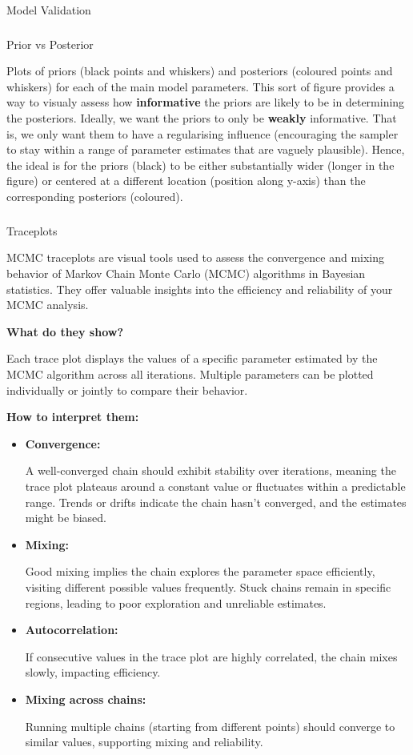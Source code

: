 \documentclass[
  8pt,
  a4paper]{article}
\makeatletter
\let\oldparagraph\paragraph
\renewcommand{\paragraph}{
    \@ifstar
      \xxxParagraphStar
      \xxxParagraphNoStar
  }
\newcommand{\xxxParagraphStar}[1]{\oldparagraph*{#1}\mbox{}}
\newcommand{\xxxParagraphNoStar}[1]{\oldparagraph{#1}\mbox{}}
\let\oldsubparagraph\subparagraph
\renewcommand{\subparagraph}{
    \@ifstar
      \xxxSubParagraphStar
      \xxxSubParagraphNoStar
  }
\newcommand{\xxxSubParagraphStar}[1]{\oldsubparagraph*{#1}\mbox{}}
\newcommand{\xxxSubParagraphNoStar}[1]{\oldsubparagraph{#1}\mbox{}}
\makeatother
\begin{document}
\paragraph{Model Validation}\label{sec-validation}

\subparagraph{Prior vs Posterior}\label{prior-vs-posterior}

Plots of priors (black points and whiskers) and posteriors (coloured
points and whiskers) for each of the main model parameters. This sort of
figure provides a way to visualy assess how \textbf{informative} the
priors are likely to be in determining the posteriors. Ideally, we want
the priors to only be \textbf{weakly} informative. That is, we only want
them to have a regularising influence (encouraging the sampler to stay
within a range of parameter estimates that are vaguely plausible).
Hence, the ideal is for the priors (black) to be either substantially
wider (longer in the figure) or centered at a different location
(position along y-axis) than the corresponding posteriors (coloured).

\subparagraph{Traceplots}\label{traceplots}

MCMC traceplots are visual tools used to assess the convergence and
mixing behavior of Markov Chain Monte Carlo (MCMC) algorithms in
Bayesian statistics. They offer valuable insights into the efficiency
and reliability of your MCMC analysis.

\textbf{What do they show?}

Each trace plot displays the values of a specific parameter estimated by
the MCMC algorithm across all iterations. Multiple parameters can be
plotted individually or jointly to compare their behavior.

\textbf{How to interpret them:}

\begin{itemize}
\item
  \textbf{Convergence:}

  A well-converged chain should exhibit stability over iterations,
  meaning the trace plot plateaus around a constant value or fluctuates
  within a predictable range. Trends or drifts indicate the chain hasn't
  converged, and the estimates might be biased.
\item
  \textbf{Mixing:}

  Good mixing implies the chain explores the parameter space
  efficiently, visiting different possible values frequently. Stuck
  chains remain in specific regions, leading to poor exploration and
  unreliable estimates.
\item
  \textbf{Autocorrelation:}

  If consecutive values in the trace plot are highly correlated, the
  chain mixes slowly, impacting efficiency.
\item
  \textbf{Mixing across chains:}

  Running multiple chains (starting from different points) should
  converge to similar values, supporting mixing and reliability.
\end{itemize}
\end{document}
